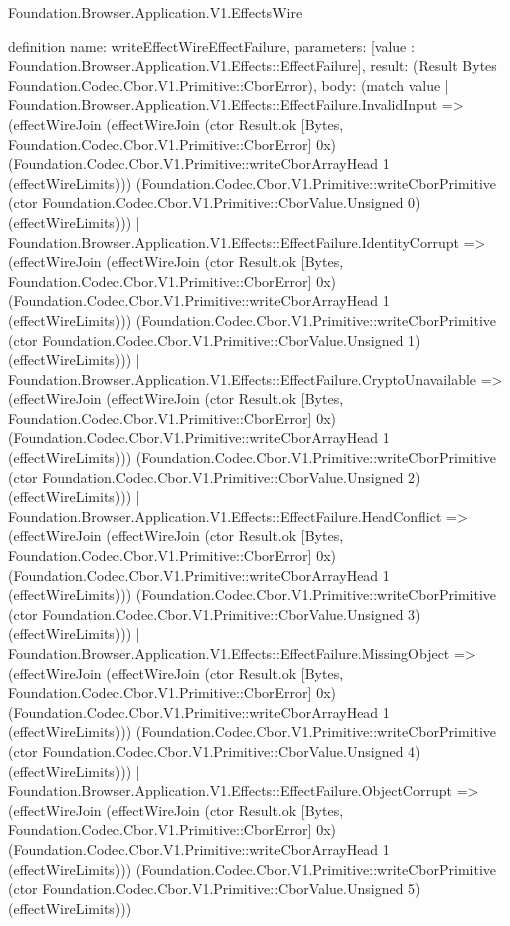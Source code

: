 \begin{lexlean}{Foundation.Browser.Application.V1.EffectsWire}
\begin{semanticmodule}
definition{
  name: writeEffectWireEffectFailure,
  parameters: [value : Foundation.Browser.Application.V1.Effects::EffectFailure],
  result: (Result Bytes Foundation.Codec.Cbor.V1.Primitive::CborError),
  body: (match value
    | Foundation.Browser.Application.V1.Effects::EffectFailure.InvalidInput => (effectWireJoin (effectWireJoin (ctor Result.ok [Bytes, Foundation.Codec.Cbor.V1.Primitive::CborError] 0x) (Foundation.Codec.Cbor.V1.Primitive::writeCborArrayHead 1 (effectWireLimits))) (Foundation.Codec.Cbor.V1.Primitive::writeCborPrimitive (ctor Foundation.Codec.Cbor.V1.Primitive::CborValue.Unsigned 0) (effectWireLimits)))
    | Foundation.Browser.Application.V1.Effects::EffectFailure.IdentityCorrupt => (effectWireJoin (effectWireJoin (ctor Result.ok [Bytes, Foundation.Codec.Cbor.V1.Primitive::CborError] 0x) (Foundation.Codec.Cbor.V1.Primitive::writeCborArrayHead 1 (effectWireLimits))) (Foundation.Codec.Cbor.V1.Primitive::writeCborPrimitive (ctor Foundation.Codec.Cbor.V1.Primitive::CborValue.Unsigned 1) (effectWireLimits)))
    | Foundation.Browser.Application.V1.Effects::EffectFailure.CryptoUnavailable => (effectWireJoin (effectWireJoin (ctor Result.ok [Bytes, Foundation.Codec.Cbor.V1.Primitive::CborError] 0x) (Foundation.Codec.Cbor.V1.Primitive::writeCborArrayHead 1 (effectWireLimits))) (Foundation.Codec.Cbor.V1.Primitive::writeCborPrimitive (ctor Foundation.Codec.Cbor.V1.Primitive::CborValue.Unsigned 2) (effectWireLimits)))
    | Foundation.Browser.Application.V1.Effects::EffectFailure.HeadConflict => (effectWireJoin (effectWireJoin (ctor Result.ok [Bytes, Foundation.Codec.Cbor.V1.Primitive::CborError] 0x) (Foundation.Codec.Cbor.V1.Primitive::writeCborArrayHead 1 (effectWireLimits))) (Foundation.Codec.Cbor.V1.Primitive::writeCborPrimitive (ctor Foundation.Codec.Cbor.V1.Primitive::CborValue.Unsigned 3) (effectWireLimits)))
    | Foundation.Browser.Application.V1.Effects::EffectFailure.MissingObject => (effectWireJoin (effectWireJoin (ctor Result.ok [Bytes, Foundation.Codec.Cbor.V1.Primitive::CborError] 0x) (Foundation.Codec.Cbor.V1.Primitive::writeCborArrayHead 1 (effectWireLimits))) (Foundation.Codec.Cbor.V1.Primitive::writeCborPrimitive (ctor Foundation.Codec.Cbor.V1.Primitive::CborValue.Unsigned 4) (effectWireLimits)))
    | Foundation.Browser.Application.V1.Effects::EffectFailure.ObjectCorrupt => (effectWireJoin (effectWireJoin (ctor Result.ok [Bytes, Foundation.Codec.Cbor.V1.Primitive::CborError] 0x) (Foundation.Codec.Cbor.V1.Primitive::writeCborArrayHead 1 (effectWireLimits))) (Foundation.Codec.Cbor.V1.Primitive::writeCborPrimitive (ctor Foundation.Codec.Cbor.V1.Primitive::CborValue.Unsigned 5) (effectWireLimits)))
}
\end{semanticmodule}
\end{lexlean}
